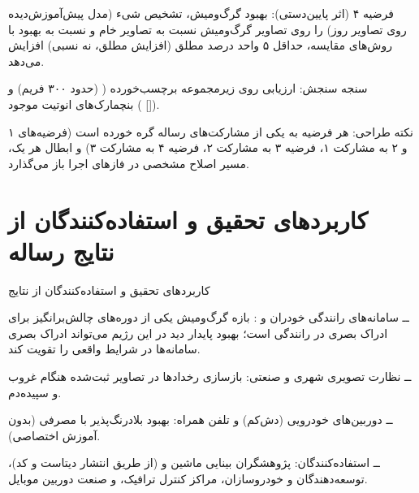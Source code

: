 \documentclass[12pt,a4paper]{article}
\begin{document}
فرضیه ۴ (اثر پایین‌دستی): بهبود گرگ‌ومیش،  تشخیص شیء (مدل پیش‌آموزش‌دیده روی تصاویر روز) را روی تصاویر گرگ‌ومیش نسبت به تصاویر خام و نسبت به بهبود با روش‌های مقایسه، حداقل ۵ واحد درصد مطلق (افزایش مطلق، نه نسبی) افزایش می‌دهد.\par
سنجه سنجش: ارزیابی روی زیرمجموعه برچسب‌خورده (  (حدود ۳۰۰ فریم) و بنچمارک‌های انوتیت موجود ( []).\par
نکته طراحی: هر فرضیه به یکی از مشارکت‌های رساله گره خورده است (فرضیه‌های ۱ و ۲ به مشارکت ۱، فرضیه ۳ به مشارکت ۲، فرضیه ۴ به مشارکت ۳) و ابطال هر یک، مسیر اصلاح مشخصی در فازهای اجرا باز می‌گذارد.\par


\section{کاربردهای تحقیق و استفاده‌کنندگان از نتایج رساله}
کاربردهای تحقیق و استفاده‌کنندگان از نتایج\par
ــ سامانه‌های رانندگی خودران و : بازه گرگ‌ومیش یکی از دوره‌های چالش‌برانگیز برای ادراک بصری در رانندگی است؛ بهبود پایدار دید در این رژیم می‌تواند ادراک بصری سامانه‌ها در شرایط واقعی را تقویت کند.\par
ــ نظارت تصویری شهری و صنعتی: بازسازی رخدادها در تصاویر ثبت‌شده هنگام غروب و سپیده‌دم.\par
ــ دوربین‌های خودرویی (دش‌کم) و تلفن همراه: بهبود بلادرنگ‌پذیر با  مصرفی (بدون آموزش اختصاصی).\par
ــ استفاده‌کنندگان: پژوهشگران بینایی ماشین و   (از طریق انتشار دیتاست  و کد)، توسعه‌دهندگان  و خودروسازان، مراکز کنترل ترافیک، و صنعت دوربین موبایل.\par
\end{document}
